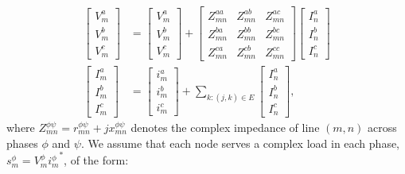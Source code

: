 \begin{align}
	    \begin{bmatrix}
  		V_{m}^{a} \\
  		V_{m}^{b} \\
  		V_{m}^{c}
  	\end{bmatrix}
  	&=
  	\begin{bmatrix}
  		V_{m}^{a} \\
  		V_{m}^{b} \\
  		V_{m}^{c}
  	\end{bmatrix}
  	+
  	\begin{bmatrix}
  		Z^{aa}_{mn} & Z^{ab}_{mn} & Z^{ac}_{mn} \\
  		Z^{ba}_{mn} & Z^{bb}_{mn} & Z^{bc}_{mn} \\
  		Z^{ca}_{mn} & Z^{cb}_{mn} & Z^{cc}_{mn}
  	\end{bmatrix}
  	\begin{bmatrix}
  		I_{n}^{a} \\
  		I_{n}^{b} \\
  		I_{n}^{c}
  	\end{bmatrix} \label{eq:KVL}
    \\
    \begin{bmatrix}
  		I_{m}^{a} \\
  		I_{m}^{b} \\
  		I_{m}^{c}
  	\end{bmatrix}
  	&= \begin{bmatrix}
  		i_{m}^{a} \\
  		i_{m}^{b} \\
  		i_{m}^{c}
  	\end{bmatrix} + \sum_{k:(j,k) \in E}
  	\begin{bmatrix}
  		I_{n}^{a} \\
  		I_{n}^{b} \\
  		I_{n}^{c}
  	\end{bmatrix}\label{eq:KCL},
\end{align}
where $Z^{\phi \psi}_{mn} = r^{\phi \psi}_{mn} + jx^{\phi \psi}_{mn}$ denotes the complex impedance of line $(m,n)$ across phases $\phi$ and $\psi$.
We assume that each node serves a complex load in each phase, $s_{m}^{\phi} = V_{m}^{\phi} {i_{m}^{\phi}}^{*}$, of the form:


